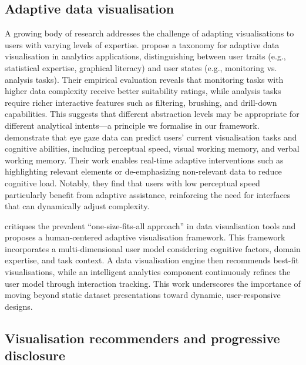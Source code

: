 \documentclass[12pt,a4paper]{article}
\begin{document}
\subsection{Adaptive data visualisation}

A growing body of research addresses the challenge of adapting visualisations to users with varying levels of expertise. \citet{poetzsch2020towardataxonomy} propose a taxonomy for adaptive data visualisation in analytics applications, distinguishing between user traits (e.g., statistical expertise, graphical literacy) and user states (e.g., monitoring vs. analysis tasks). Their empirical evaluation reveals that monitoring tasks with higher data complexity receive better suitability ratings, while analysis tasks require richer interactive features such as filtering, brushing, and drill-down capabilities. This suggests that different abstraction levels may be appropriate for different analytical intents---a principle we formalise in our framework.
\vspace{1em}
\noindent \citet{steichen2013useradaptiveinformationvisualisation} demonstrate that eye gaze data can predict users' current visualisation tasks and cognitive abilities, including perceptual speed, visual working memory, and verbal working memory. Their work enables real-time adaptive interventions such as highlighting relevant elements or de-emphasizing non-relevant data to reduce cognitive load. Notably, they find that users with low perceptual speed particularly benefit from adaptive assistance, reinforcing the need for interfaces that can dynamically adjust complexity.

\vspace{1em}

\noindent \citet{amyrotos2021adaptivevisualisationsfor} critiques the prevalent ``one-size-fits-all approach'' in data visualisation tools and proposes a human-centered adaptive visualisation framework. This framework incorporates a multi-dimensional user model considering cognitive factors, domain expertise, and task context. A data visualisation engine then recommends best-fit visualisations, while an intelligent analytics component continuously refines the user model through interaction tracking. This work underscores the importance of moving beyond static dataset presentations toward dynamic, user-responsive designs.

\subsection{Visualisation recommenders and progressive disclosure}
\end{document}

